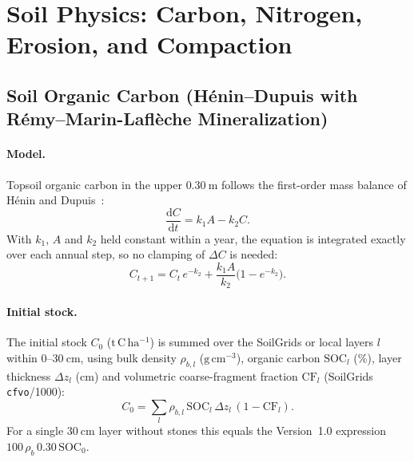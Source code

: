 \section{Soil Physics: Carbon, Nitrogen, Erosion, and Compaction}
\label{sec:soil-physics}

\subsection{Soil Organic Carbon (H{\'e}nin--Dupuis with R{\'e}my--Marin-Lafl{\`e}che Mineralization)}
\paragraph{Model.} Topsoil organic carbon in the upper $0.30~\mathrm{m}$ follows the first-order mass balance of H{\'e}nin and Dupuis~\cite{henin1945essai}:
\begin{equation}
  \frac{\mathrm{d}C}{\mathrm{d}t} = k_1 A - k_2 C .
\end{equation}
With $k_1$, $A$ and $k_2$ held constant within a year, the equation is integrated exactly over each annual step, so no clamping of $\Delta C$ is needed:
\begin{equation}
  C_{t+1} = C_t\, e^{-k_2} + \frac{k_1 A}{k_2}\bigl(1 - e^{-k_2}\bigr).
\end{equation}

\paragraph{Initial stock.} The initial stock $C_0$ ($\mathrm{t\,C\,ha^{-1}}$) is summed over the SoilGrids or local layers $l$ within $0$--$30~\mathrm{cm}$, using bulk density $\rho_{b,l}$ ($\mathrm{g\,cm^{-3}}$), organic carbon $\mathrm{SOC}_l$ ($\%$), layer thickness $\Delta z_l$ ($\mathrm{cm}$) and volumetric coarse-fragment fraction $\mathrm{CF}_l$ (SoilGrids \texttt{cfvo}/1000):
\begin{equation}
  C_0 = \sum_{l} \rho_{b,l}\, \mathrm{SOC}_l\, \Delta z_l\, (1 - \mathrm{CF}_l).
\end{equation}
For a single $30~\mathrm{cm}$ layer without stones this equals the Version~1.0 expression $100\,\rho_b\,0.30\,\mathrm{SOC}_0$.

